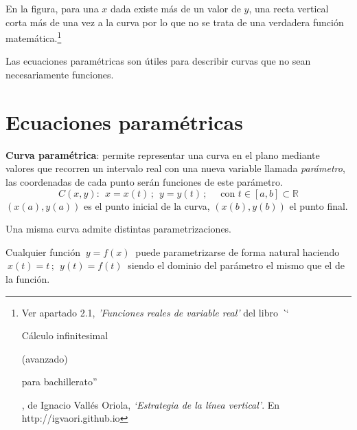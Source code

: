 \vspace{-5mm}
En la figura, para una $x$ dada existe más de un valor de $y$, una recta vertical corta más de una vez a la curva por lo que no se trata de una verdadera función matemática.\footnote{Ver apartado 2.1, \textit {'Funciones reales de variable real'} del libro \textit`` {Cálculo infinitesimal \begin{scriptsize}(avanzado)\end{scriptsize} para bachillerato''}, de Ignacio Vallés Oriola, \textit{`Estrategia de la línea vertical'}. En  $\ \ $\textcolor{blau}{http://igvaori.github.io}}

Las ecuaciones paramétricas son útiles para describir curvas que no sean necesariamente funciones.

\section{Ecuaciones paramétricas}
\vspace{-5mm}



\begin{cuadro-naranja}
\textbf{Curva paramétrica}: permite representar una curva en el plano mediante valores que recorren un intervalo real con una nueva variable llamada \emph{parámetro}, las coordenadas de cada punto serán funciones de este parámetro.
\vspace{-2mm}
$$C(x,y):\ \ x=x(t)\,;\ \ y=y(t)\, ; \quad \text{ con } t\in [a,b]\subset \mathbb R $$
\vspace{-2mm}
$(x(a),y(a))$ es el punto inicial de la curva, $(x(b),y(b))$ el punto final.
\vspace{2mm}
\end{cuadro-naranja}

Una misma curva admite distintas parametrizaciones.

\textsf{Cualquier función $\ y=f(x) \ $ puede parametrizarse de forma natural haciendo $\ x(t)=t\, ;\ \ y(t)=f(t) \ $ siendo el dominio del parámetro el mismo que el de la función.}

